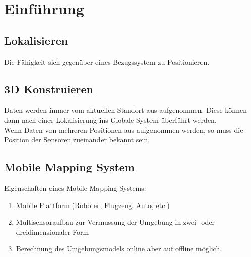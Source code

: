 \chapter{Einführung}
\label{chp:einfuehrung}	

\section{Lokalisieren}
\label{chp:einfuehrung:sec:lokalisieren}
Die Fähigkeit sich gegenüber eines Bezugssystem zu Positionieren.
	
\section{3D Konstruieren}
\label{chp:einfuehrung:sec:3DKonstruieren}
Daten werden immer vom aktuellen Standort aus aufgenommen. Diese können dann nach einer Lokalisierung ins Globale System überführt werden.\\
Wenn Daten von mehreren Positionen aus aufgenommen werden, so muss die Position der Sensoren zueinander bekannt sein.

\section{Mobile Mapping System}
\label{chp:einfuehrung:sec:MobileMappingSystem}

Eigenschaften eines Mobile Mapping Systems:
\begin{enumerate}
	\item Mobile Plattform (Roboter, Flugzeug, Auto, etc.)
	\item Multisensoraufbau zur Vermussung der Umgebung in zwei- oder dreidimensionaler Form
	\item Berechnung des Umgebungsmodels online aber auf offline möglich.
\end{enumerate}
